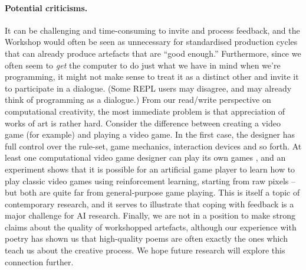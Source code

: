 \paragraph{Potential criticisms.}
It can be challenging and time-consuming to invite and process feedback, and the Workshop would
often be seen as unnecessary for standardised production cycles that can already produce artefacts that are ``good enough.''
Furthermore, since we often seem to \emph{get} the computer to do just what we have in mind when we're programming,
it might not make sense to treat it as a distinct other and invite it to participate in a dialogue.
(Some REPL users may disagree, and may already think of programming as a dialogue.)
%
%
From our read/write perspective on computational creativity, the most
immediate problem is that appreciation of works of art is rather hard.
Consider the difference between creating a video game (for example)
and playing a video game.  In the first case, the designer has full
control over the rule-set, game mechanics, interaction devices and so
forth.  At least one computational video game designer can play its
own games \cite{cook2013mechanic}, and an experiment shows that it is
possible for an artificial game player to learn how to play classic
video games using reinforcement learning, starting from raw pixels
\cite{deepmind-atari} -- but both are quite far from general-purpose
game playing.  This is itself a topic of contemporary research, and
it serves to illustrate that coping with feedback is a major challenge for AI research.
%
Finally, we are not in a position to make strong claims about the quality of workshopped artefacts,
although our experience with poetry has shown us that high-quality poems are often exactly
the ones which teach us about the creative process.
We hope future research will explore this connection further.

